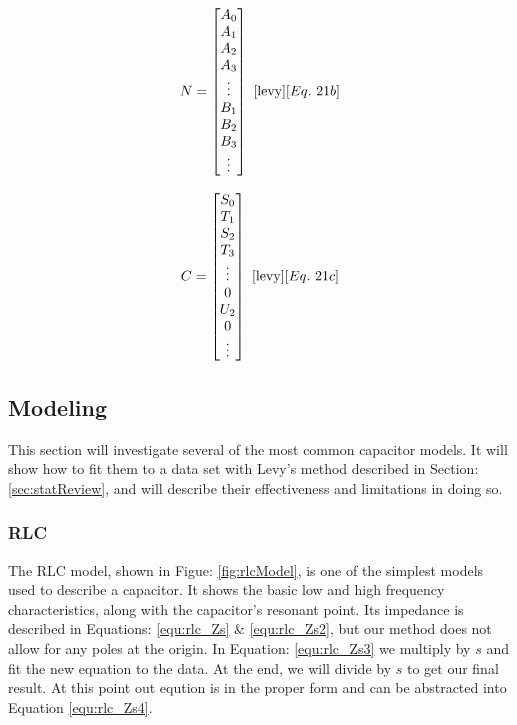 \begin{multicols}{2}
\begin{equation}
\label{equ:Levy_N}
N = 
\begin{bmatrix}
A_0 \\
A_1 \\
A_2 \\
A_3 \\
\vdots \\
B_1 \\
B_2 \\
B_3 \\
\vdots
\end{bmatrix}
~\cite{levy}[Eq.~21b]
\end{equation}

\begin{equation}
\label{equ:Levy_C}
C = 
\begin{bmatrix}
S_0 \\
T_1 \\
S_2 \\
T_3 \\
\vdots \\
0   \\
U_2 \\
0   \\
\vdots
\end{bmatrix}
~\cite{levy}[Eq.~21c]
\end{equation}
\end{multicols}

\subsection{Modeling}
This section will investigate several of the most common capacitor models. It will show how to fit them to a data set with Levy's method described in Section: \ref{sec:statReview}, and will describe their effectiveness and limitations in doing so.

\subsubsection{RLC}


The RLC model, shown in Figue: \ref{fig:rlcModel}, is one of the simplest models used to describe a capacitor. It shows the basic low and high frequency characteristics, along with the capacitor's resonant point. Its impedance is described in Equations: \eqref{equ:rlc_Zs} \& \eqref{equ:rlc_Zs2}, but our method does not allow for any poles at the origin. In Equation: \eqref{equ:rlc_Zs3} we multiply by $s$ and fit the new equation to the data. At the end, we will divide by $s$ to get our final result. At this point out eqution is in the proper form and can be abstracted into Equation \eqref{equ:rlc_Zs4}.

